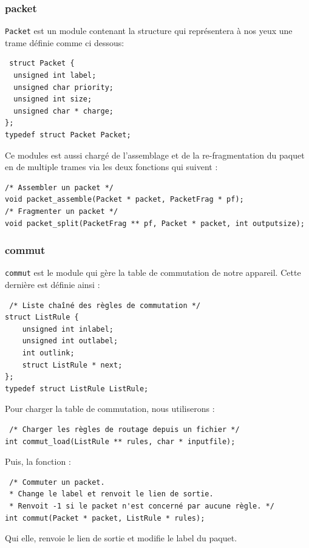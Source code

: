 \documentclass[a4paper,11pt]{article}
\begin{document}
\subsubsection{packet}
\texttt{Packet} est un module contenant la structure qui représentera à nos yeux une trame définie comme ci dessous:
\begin{verbatim}
 struct Packet {
  unsigned int label;
  unsigned char priority;
  unsigned int size;
  unsigned char * charge;
};
typedef struct Packet Packet;
\end{verbatim}
Ce modules est aussi chargé de l'assemblage et de la re-fragmentation du paquet en de multiple trames via les deux fonctions qui suivent :
\begin{verbatim}
/* Assembler un packet */
void packet_assemble(Packet * packet, PacketFrag * pf);
/* Fragmenter un packet */
void packet_split(PacketFrag ** pf, Packet * packet, int outputsize);
\end{verbatim}




\subsubsection{commut}
\texttt{commut} est le module qui gère la table de commutation de notre appareil. Cette dernière est définie ainsi :
\begin{verbatim}
 /* Liste chaîné des règles de commutation */
struct ListRule {
    unsigned int inlabel;
    unsigned int outlabel;
    int outlink;
    struct ListRule * next;
};
typedef struct ListRule ListRule;
\end{verbatim}
Pour charger la table de commutation, nous utiliserons :
\begin{verbatim}
 /* Charger les règles de routage depuis un fichier */
int commut_load(ListRule ** rules, char * inputfile);
\end{verbatim}
Puis, la fonction :
\begin{verbatim}
 /* Commuter un packet.
 * Change le label et renvoit le lien de sortie.
 * Renvoit -1 si le packet n'est concerné par aucune règle. */
int commut(Packet * packet, ListRule * rules);
\end{verbatim}
Qui elle, renvoie le lien de sortie et modifie le label du paquet.
\end{document}
